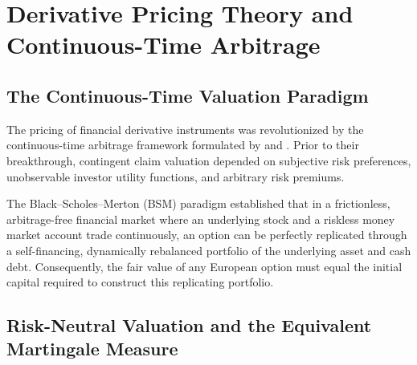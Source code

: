 
\section{Derivative Pricing Theory and Continuous-Time Arbitrage}
\label{sec:derivative_theory}

\subsection{The Continuous-Time Valuation Paradigm}

The pricing of financial derivative instruments was revolutionized by the continuous-time arbitrage framework formulated by \citet{black1973pricing} and \citet{merton1973theory}. Prior to their breakthrough, contingent claim valuation depended on subjective risk preferences, unobservable investor utility functions, and arbitrary risk premiums. 

The Black--Scholes--Merton (BSM) paradigm established that in a frictionless, arbitrage-free financial market where an underlying stock and a riskless money market account trade continuously, an option can be perfectly replicated through a self-financing, dynamically rebalanced portfolio of the underlying asset and cash debt. Consequently, the fair value of any European option must equal the initial capital required to construct this replicating portfolio.

\subsection{Risk-Neutral Valuation and the Equivalent Martingale Measure}


